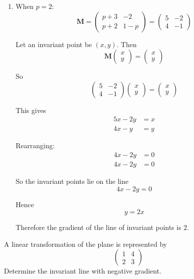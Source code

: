\documentclass[leqno]{article}
\begin{document}
\begin{enumerate}[
  label=\textbf{\arabic*.},
  leftmargin=*,
  topsep=0pt,
  partopsep=0pt,
  parsep=0pt
]
\begin{djsSolution}
\begin{enumerate}[label=\textbf{(\alph*)}]
So the image of $(3,4)$ under $T$ is $(-2,11)$, as required.

  \item When $p=2$:
\[
\mathbf{M}=\begin{pmatrix}
p+3 & -2\\
p+2 & 1-p
\end{pmatrix}
=
\begin{pmatrix}
5 & -2\\
4 & -1
\end{pmatrix}
\]

Let an invariant point be $(x,y)$. Then
\[
\mathbf{M}\begin{pmatrix}x\\y\end{pmatrix}=\begin{pmatrix}x\\y\end{pmatrix}
\]

So
\[
\begin{pmatrix}
5 & -2\\
4 & -1
\end{pmatrix}
\begin{pmatrix}
x\\
y
\end{pmatrix}
=
\begin{pmatrix}
x\\
y
\end{pmatrix}
\]

This gives
\begin{align*}
5x-2y&=x\\
4x-y&=y
\end{align*}

Rearranging:
\begin{align*}
4x-2y&=0\\
4x-2y&=0
\end{align*}

So the invariant points lie on the line
\[
4x-2y=0
\]

Hence
\[
y=2x
\]

Therefore the gradient of the line of invariant points is $2$.
\end{enumerate}
\end{djsSolution}


\newpage

\questionitem

A linear transformation of the plane is represented by
\[
\begin{pmatrix}
1 & 4 \\
2 & 3
\end{pmatrix}
\]
Determine the invariant line with negative gradient. 


\end{enumerate}
\end{document}

